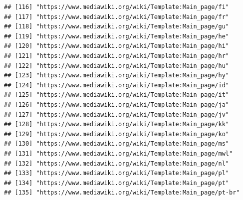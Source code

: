 \documentclass[
]{article}
\begin{document}
\begin{verbatim}
## [116] "https://www.mediawiki.org/wiki/Template:Main_page/fi"                                                                        
## [117] "https://www.mediawiki.org/wiki/Template:Main_page/fr"                                                                        
## [118] "https://www.mediawiki.org/wiki/Template:Main_page/gu"                                                                        
## [119] "https://www.mediawiki.org/wiki/Template:Main_page/he"                                                                        
## [120] "https://www.mediawiki.org/wiki/Template:Main_page/hi"                                                                        
## [121] "https://www.mediawiki.org/wiki/Template:Main_page/hr"                                                                        
## [122] "https://www.mediawiki.org/wiki/Template:Main_page/hu"                                                                        
## [123] "https://www.mediawiki.org/wiki/Template:Main_page/hy"                                                                        
## [124] "https://www.mediawiki.org/wiki/Template:Main_page/id"                                                                        
## [125] "https://www.mediawiki.org/wiki/Template:Main_page/it"                                                                        
## [126] "https://www.mediawiki.org/wiki/Template:Main_page/ja"                                                                        
## [127] "https://www.mediawiki.org/wiki/Template:Main_page/jv"                                                                        
## [128] "https://www.mediawiki.org/wiki/Template:Main_page/kk"                                                                        
## [129] "https://www.mediawiki.org/wiki/Template:Main_page/ko"                                                                        
## [130] "https://www.mediawiki.org/wiki/Template:Main_page/ms"                                                                        
## [131] "https://www.mediawiki.org/wiki/Template:Main_page/mwl"                                                                       
## [132] "https://www.mediawiki.org/wiki/Template:Main_page/nl"                                                                        
## [133] "https://www.mediawiki.org/wiki/Template:Main_page/pl"                                                                        
## [134] "https://www.mediawiki.org/wiki/Template:Main_page/pt"                                                                        
## [135] "https://www.mediawiki.org/wiki/Template:Main_page/pt-br"                                                                     

\end{verbatim}
\end{document}

